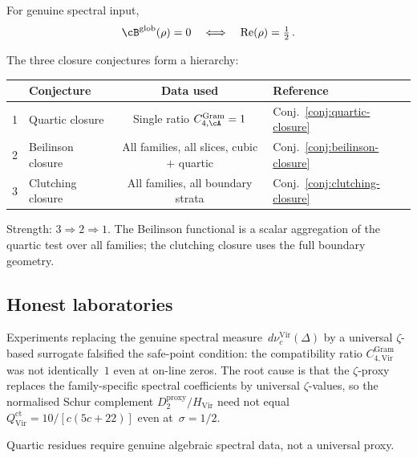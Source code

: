 \begin{conjecture}%
\label{conj:beilinson-closure}%
\ClaimStatusConjectured%
%
For genuine spectral input,
\begin{equation}\label{eq:beilinson-closure}
\cB^{\mathrm{glob}}(\rho) = 0
\quad\Longleftrightarrow\quad
\operatorname{Re}(\rho) = \tfrac12\,.
\end{equation}
\end{conjecture}

\begin{remark}%
\label{rem:beilinson-closure-hierarchy}%
%
The three closure conjectures form a hierarchy:
\begin{center}
\small
\renewcommand{\arraystretch}{1.3}
\begin{tabular}{clcl}
\toprule
& \textbf{Conjecture} & \textbf{Data used}
& \textbf{Reference} \\
\midrule
1 & Quartic closure
 & Single ratio $C_{4,\cA}^{\mathrm{Gram}} = 1$
 & Conj.~\ref{conj:quartic-closure} \\
2 & Beilinson closure
 & All families, all slices, cubic $+$ quartic
 & Conj.~\ref{conj:beilinson-closure} \\
3 & Clutching closure
 & All families, all boundary strata
 & Conj.~\ref{conj:clutching-closure} \\
\bottomrule
\end{tabular}
\end{center}
Strength: $3 \Rightarrow 2 \Rightarrow 1$.
The Beilinson functional is a scalar aggregation of the
quartic test over all families; the clutching closure
uses the full boundary geometry.
\end{remark}

\subsection{Honest laboratories}%
\label{sec:honest-laboratories}%
%
%

\begin{remark}%
\label{rem:zeta-proxy-failure}%
%
Experiments replacing the genuine spectral
measure~$d\nu_c^{\mathrm{Vir}}(\Delta)$ by a universal
$\zeta$-based surrogate falsified the safe-point condition:
the compatibility ratio $C_{4,\mathrm{Vir}}^{\mathrm{Gram}}$
was not identically~$1$ even at on-line zeros.
The root cause is that the $\zeta$-proxy replaces the
family-specific spectral coefficients by universal
$\zeta$-values, so the normalised Schur complement
$D_2^{\mathrm{proxy}}/H_{\mathrm{Vir}}$ need not equal
$Q_{\mathrm{Vir}}^{\mathrm{ct}} = 10/[c(5c{+}22)]$ even
at~$\sigma = 1/2$.

Quartic residues require genuine
algebraic spectral data, not a universal proxy.
\end{remark}

